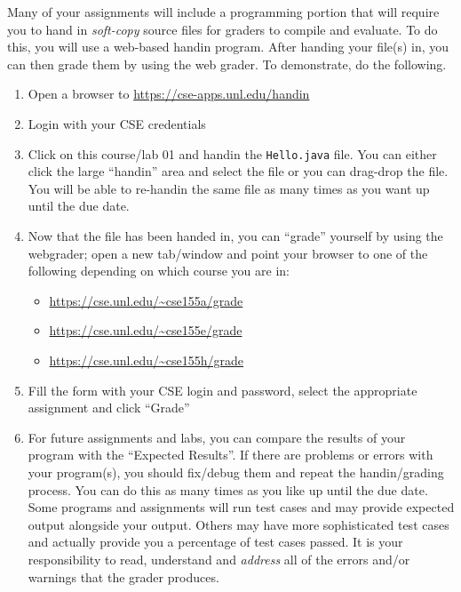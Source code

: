 \documentclass[12pt]{scrartcl}
\begin{document}
Many of your assignments will include a programming portion that will 
require you to hand in \emph{soft-copy} source files for graders to compile 
and evaluate.  To do this, you will use a web-based handin program.  
After handing your file(s) in, you can then grade them by using the
web grader.  To demonstrate, do the following.

\begin{enumerate}
  \item Open a browser to \url{https://cse-apps.unl.edu/handin}
  \item Login with your CSE credentials
  \item Click on this course/lab 01 and handin the \texttt{Hello.java} file.  You can
  either click the large ``handin'' area and select the file or you can drag-drop
  the file.  You will be able to re-handin the same file as many times as you want up until
  the due date.
  \item Now that the file has been handed in, you can ``grade'' 
  yourself by using the webgrader; open a new tab/window and point 
  your browser to one of the following depending on which course 
  you are in:
  \begin{itemize}
    \item \url{https://cse.unl.edu/~cse155a/grade}
    \item \url{https://cse.unl.edu/~cse155e/grade}
    \item \url{https://cse.unl.edu/~cse155h/grade}
  \end{itemize}
  \item Fill the form with your CSE login and password, select the 
  appropriate assignment and click ``Grade''
  \item For future assignments and labs, you can compare the results of 
  	your program with the ``Expected Results''.  If there are problems or errors with
	your program(s), you should fix/debug them and repeat the handin/grading process.
	You can do this as many times as you like up until the due date.  Some programs 
	and assignments will run test cases and may provide expected output alongside 
	your output.  Others may have more sophisticated test cases and actually provide 
	you a percentage of test cases passed.  It is your responsibility to read, 
	understand and \emph{address} all of the errors and/or warnings that the grader produces.
\end{enumerate}
\end{document}
